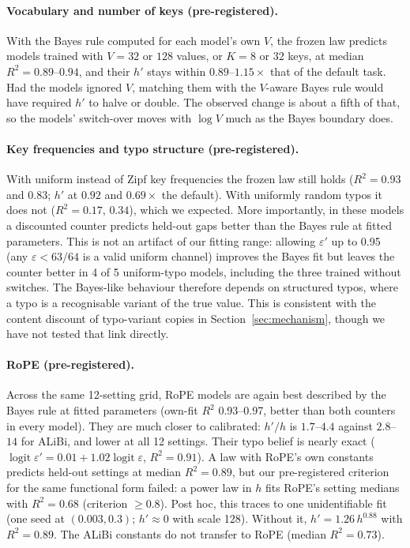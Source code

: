 \documentclass[11pt]{article}
\newcommand{\hp}{h'}
\newcommand{\ep}{\varepsilon'}
\begin{document}
\paragraph{Vocabulary and number of keys (pre-registered).} With the Bayes rule computed for each model's own $V$, the frozen law predicts models trained with $V = 32$ or $128$ values, or $K = 8$ or $32$ keys, at median $R^2 = 0.89$--$0.94$, and their $\hp$ stays within $0.89$--$1.15\times$ that of the default task. Had the models ignored $V$, matching them with the $V$-aware Bayes rule would have required $\hp$ to halve or double. The observed change is about a fifth of that, so the models' switch-over moves with $\log V$ much as the Bayes boundary does.

\paragraph{Key frequencies and typo structure (pre-registered).} With uniform instead of Zipf key frequencies the frozen law still holds ($R^2 = 0.93$ and $0.83$; $\hp$ at $0.92$ and $0.69\times$ the default). With uniformly random typos it does not ($R^2 = 0.17$, $0.34$), which we expected. More importantly, in these models a discounted counter predicts held-out gaps better than the Bayes rule at fitted parameters. This is not an artifact of our fitting range: allowing $\ep$ up to 0.95 (any $\varepsilon < 63/64$ is a valid uniform channel) improves the Bayes fit but leaves the counter better in 4 of 5 uniform-typo models, including the three trained without switches. The Bayes-like behaviour therefore depends on structured typos, where a typo is a recognisable variant of the true value. This is consistent with the content discount of typo-variant copies in Section~\ref{sec:mechanism}, though we have not tested that link directly.

\paragraph{RoPE (pre-registered).} Across the same 12-setting grid, RoPE models are again best described by the Bayes rule at fitted parameters (own-fit $R^2$ 0.93--0.97, better than both counters in every model). They are much closer to calibrated: $\hp/h$ is $1.7$--$4.4$ against $2.8$--$14$ for ALiBi, and lower at all 12 settings. Their typo belief is nearly exact ($\operatorname{logit}\ep = 0.01 + 1.02\operatorname{logit}\varepsilon$, $R^2 = 0.91$). A law with RoPE's own constants predicts held-out settings at median $R^2 = 0.89$, but our pre-registered criterion for the same functional form failed: a power law in $h$ fits RoPE's setting medians with $R^2 = 0.68$ (criterion $\ge 0.8$). Post hoc, this traces to one unidentifiable fit (one seed at $(0.003, 0.3)$; $\hp \approx 0$ with scale 128). Without it, $\hp = 1.26\,h^{0.88}$ with $R^2 = 0.89$. The ALiBi constants do not transfer to RoPE (median $R^2 = 0.73$).
\end{document}
